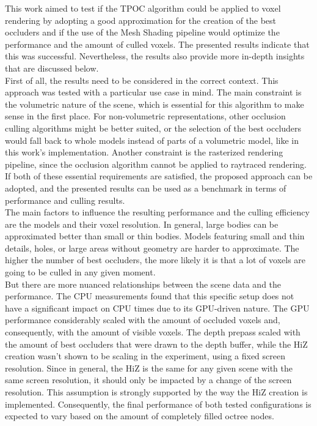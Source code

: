 This work aimed to test if the \ac{TPOC} algorithm could be applied to voxel rendering by adopting a good approximation 
for the creation of the best occluders and if the use of the Mesh Shading pipeline would optimize the performance and 
the amount of culled voxels. The presented results indicate that this was successful. Nevertheless, the results also 
provide more in-depth insights that are discussed below. \\

\noindent
First of all, the results need to be considered in the correct context. This approach was tested with a particular use case 
in mind. The main constraint is the volumetric nature of the scene, which is essential for this algorithm to make sense in 
the first place. For non-volumetric representations, other occlusion culling algorithms might be better suited, or the 
selection of the best occluders would fall back to whole models instead of parts of a volumetric model, like in this work's 
implementation. Another constraint is the rasterized rendering pipeline, since the occlusion algorithm cannot be applied to 
raytraced rendering. If both of these essential requirements are satisfied, the proposed approach can be adopted, and the 
presented results can be used as a benchmark in terms of performance and culling results. \\

\noindent
The main factors to influence the resulting performance and the culling efficiency are the models and their voxel resolution.
In general, large bodies can be approximated better than small or thin bodies. Models featuring small and thin details, holes, 
or large areas without geometry are harder to approximate. The higher the number of best occluders, the more likely it is 
that a lot of voxels are going to be culled in any given moment. \\

\noindent
But there are more nuanced relationships between the scene data and the performance. The \ac{CPU} measurements found that this 
specific setup does not have a significant impact on \ac{CPU} times due to its \ac{GPU}-driven nature. The \ac{GPU} performance 
considerably scaled with the amount of occluded voxels and, consequently, with the amount of visible voxels. The depth prepass 
scaled with the amount of best occluders that were drawn to the depth buffer, while the \ac{HiZ} creation wasn't shown to be scaling 
in the experiment, using a fixed screen resolution. Since in general, the \ac{HiZ} is the same for any given scene with the same 
screen resolution, it should only be impacted by a change of the screen resolution. This assumption is strongly supported by the 
way the \ac{HiZ} creation is implemented. Consequently, the final performance of both tested configurations is expected to vary 
based on the amount of completely filled octree nodes. \\


